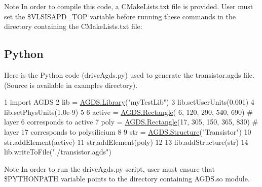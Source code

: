 \begin{DoxyNote}{Note}
In order to compile this code, a C\-Make\-Lists.\-txt file is provided. User must set the \$\-V\-L\-S\-I\-S\-A\-P\-D\-\_\-\-T\-O\-P variable before running these commands in the directory containing the C\-Make\-Lists.\-txt file\-: 
\begin{DoxyCode}
\end{DoxyCode}

\end{DoxyNote}
\hypertarget{agds_agdsPython}{}\subsection{Python}\label{agds_agdsPython}
Here is the Python code ({\ttfamily drive\-Agds.\-py}) used to generate the transistor.\-agds file. (Source is available in examples directory). 
\begin{DoxyCodeInclude}
1 \textcolor{keyword}{import} AGDS
2 lib = \hyperlink{class_a_g_d_s_1_1_library}{AGDS.Library}(\textcolor{stringliteral}{"myTestLib"})
3 lib.setUserUnits(0.001)
4 lib.setPhysUnits(1.0e-9)
5 
6 active = \hyperlink{class_a_g_d_s_1_1_rectangle}{AGDS.Rectangle}( 6, 120, 290, 540, 690) \textcolor{comment}{# layer  6 corresponds to active}
7 poly   = \hyperlink{class_a_g_d_s_1_1_rectangle}{AGDS.Rectangle}(17, 305, 150, 365, 830) \textcolor{comment}{# layer 17 corresponds to polysilicium}
8 
9 str = \hyperlink{class_a_g_d_s_1_1_structure}{AGDS.Structure}(\textcolor{stringliteral}{"Transistor"})
10 str.addElement(active)
11 str.addElement(poly)
12 
13 lib.addStructure(str)
14 lib.writeToFile(\textcolor{stringliteral}{"./transistor.agds"})
\end{DoxyCodeInclude}


\begin{DoxyNote}{Note}
In order to run the {\ttfamily drive\-Agds.\-py} script, user must ensure that \$\-P\-Y\-T\-H\-O\-N\-P\-A\-T\-H variable points to the directory containing A\-G\-D\-S.\-so module. 
\end{DoxyNote}

